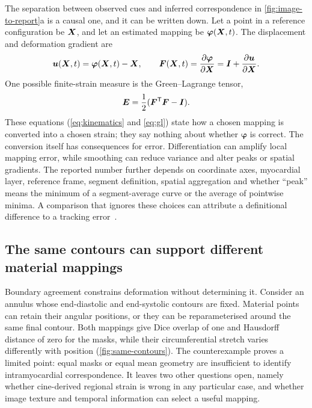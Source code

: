 The separation between observed cues and inferred correspondence in \cref{fig:image-to-report}a is a causal one, and it can be written down. Let a point in a reference configuration be \(\bm{X}\), and let an estimated mapping be \(\boldsymbol\varphi(\bm{X},t)\). The displacement and deformation gradient are
\begin{equation}
\bm{u}(\bm{X},t)=\boldsymbol\varphi(\bm{X},t)-\bm{X},
\qquad
\bm{F}(\bm{X},t)=\frac{\partial\boldsymbol\varphi}{\partial\bm{X}}
=\bm{I}+\frac{\partial\bm{u}}{\partial\bm{X}}.
\label{eq:kinematics}
\end{equation}
One possible finite-strain measure is the Green--Lagrange tensor,
\begin{equation}
\bm{E}=\frac{1}{2}(\bm{F}^{\mathsf T}\bm{F}-\bm{I}).
\label{eq:gl}
\end{equation}
These equations (\cref{eq:kinematics} and \cref{eq:gl}) state how a chosen mapping is converted into a chosen strain; they say nothing about whether \(\boldsymbol\varphi\) is correct. The conversion itself has consequences for error. Differentiation can amplify local mapping error, while smoothing can reduce variance and alter peaks or spatial gradients. The reported number further depends on coordinate axes, myocardial layer, reference frame, segment definition, spatial aggregation and whether ``peak'' means the minimum of a segment-average curve or the average of pointwise minima. A comparison that ignores these choices can attribute a definitional difference to a tracking error~\cite{voigt2015,wehner2018}.

\subsection{The same contours can support different material mappings}

Boundary agreement constrains deformation without determining it. Consider an annulus whose end-diastolic and end-systolic contours are fixed. Material points can retain their angular positions, or they can be reparameterised around the same final contour. Both mappings give Dice overlap of one and Hausdorff distance of zero for the masks, while their circumferential stretch varies differently with position (\cref{fig:same-contours}). The counterexample proves a limited point: equal masks or equal mean geometry are insufficient to identify intramyocardial correspondence. It leaves two other questions open, namely whether cine-derived regional strain is wrong in any particular case, and whether image texture and temporal information can select a useful mapping.

